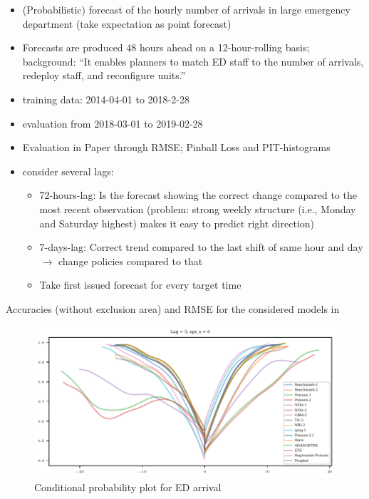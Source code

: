 \begin{itemize}
    \item (Probabilistic) forecast of the hourly number of arrivals in large emergency department (take expectation as point forecast)
    \item Forecasts are produced 48 hours ahead on a 12-hour-rolling basis; background: \enquote{It enables planners to match ED staff to the number of arrivals, redeploy staff, and reconfigure units.}
    \item training data: 2014-04-01 to 2018-2-28
    \item evaluation from 2018-03-01 to 2019-02-28
    \item Evaluation in Paper through RMSE; Pinball Loss and PIT-histograms
    \item consider several lags:
    \begin{itemize}
        \item 72-hours-lag: Is the forecast showing the correct change compared to the most recent observation (problem: strong weekly structure (i.e., Monday and Saturday highest) makes it easy to predict right direction)
        \item 7-days-lag: Correct trend compared to the last shift of same hour and day $\rightarrow$ change policies compared to that
        \item Take first issued forecast for every target time
    \end{itemize}
\end{itemize}

\begin{table}
\centering

\caption{Accuracies (without exclusion area) and RMSE for the considered models in \textcite{Rostami-Tabar2023}}	
\end{table}

\begin{figure}
	\centering
	\includegraphics{plots/ed_arrival/Cond_Prob_lag_3.pdf}
        \caption{Conditional probability plot for ED arrival}
\end{figure}